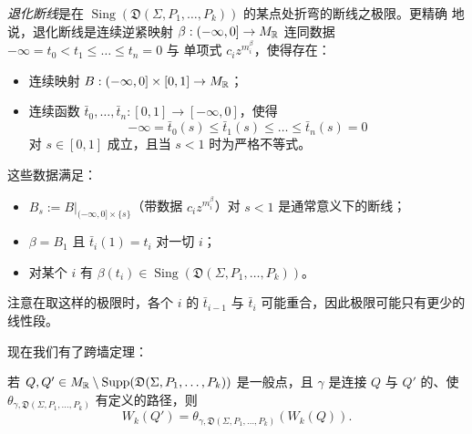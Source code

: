 \begin{definition}
\emph{退化断线}是在 $\operatorname{Sing}(\mathfrak D(\Sigma,P_1,\dots,P_k))$ 的某点处折弯的断线之极限。更精确
地说，退化断线是连续逆紧映射 $\beta : (-\infty,0]\to M_{\mathbb{R}}$ 连同数据 $-\infty = t_0<t_1\le\dots\le t_n=0$ 与
单项式 $c_iz^{m^\beta_i}$，使得存在：
\begin{itemize}[leftmargin=*]
\item 连续映射 $B : (-\infty,0]\times[0,1]\to M_{\mathbb{R}}$；
\item 连续函数 $\bar t_0,\dots,\bar t_n : [0,1]\to[-\infty,0]$，使得
\[
-\infty = \bar t_0(s)\le\bar t_1(s)\le\dots\le\bar t_n(s) = 0
\]
对 $s\in[0,1]$ 成立，且当 $s<1$ 时为严格不等式。
\end{itemize}
这些数据满足：
\begin{itemize}[leftmargin=*]
\item $B_s := B|_{(-\infty,0]\times\{s\}}$（带数据 $c_iz^{m^\beta_i}$）对 $s<1$ 是通常意义下的断线；
\item $\beta = B_1$ 且 $\bar t_i(1) = t_i$ 对一切 $i$；
\item 对某个 $i$ 有 $\beta(t_i)\in\operatorname{Sing}(\mathfrak D(\Sigma,P_1,\dots,P_k))$。
\end{itemize}
\end{definition}

注意在取这样的极限时，各个 $i$ 的 $\bar t_{i-1}$ 与 $\bar t_i$ 可能重合，因此极限可能只有更少的线性段。

现在我们有了跨墙定理：

\begin{theorem}
若 $Q,Q'\in M_{\mathbb{R}}\setminus\operatorname{Supp}(\mathfrak D(\Sigma,P_1,\dots,P_k))$ 是一般点，且 $\gamma$ 是连接
$Q$ 与 $Q'$ 的、使 $\theta_{\gamma,\mathfrak D(\Sigma,P_1,\dots,P_k)}$ 有定义的路径，则
\[
W_k(Q') = \theta_{\gamma,\mathfrak D(\Sigma,P_1,\dots,P_k)}(W_k(Q)).
\]
\end{theorem}

